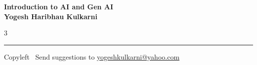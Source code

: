 \documentclass[8pt,landscape]{article}
\begin{document}
\footnotesize


\begin{center}
\Large{\textbf{Introduction to AI and Gen AI\\ Yogesh Haribhau Kulkarni}}
\end{center}

\begin{multicols}{3}

\end{multicols}

\rule{\linewidth}{0.25pt}
\scriptsize
Copyleft \textcopyleft\  Send suggestions to
\href{http://www.yogeshkulkarni.com}{yogeshkulkarni@yahoo.com}
\end{document}
